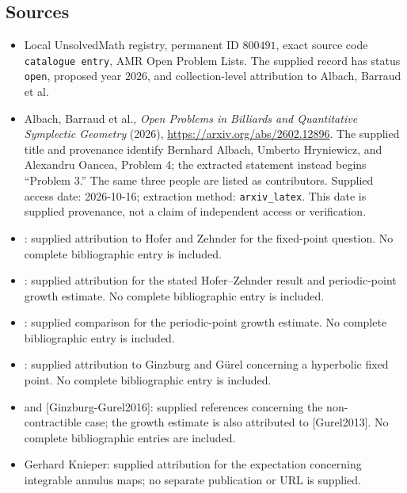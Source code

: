 \documentclass[11pt]{article}
\begin{document}
\subsection{Sources}
\begin{itemize}
\item Local UnsolvedMath registry, permanent ID \(800491\), exact source code \texttt{catalogue entry}, AMR Open Problem Lists. The supplied record has status \texttt{open}, proposed year \(2026\), and collection-level attribution to Albach, Barraud et al.
\item Albach, Barraud et al., \emph{Open Problems in Billiards and Quantitative Symplectic Geometry} (2026), \url{https://arxiv.org/abs/2602.12896}. The supplied title and provenance identify Bernhard Albach, Umberto Hryniewicz, and Alexandru Oancea, Problem 4; the extracted statement instead begins ``Problem 3.'' The same three people are listed as contributors. Supplied access date: 2026-10-16; extraction method: \texttt{arxiv\_latex}. This date is supplied provenance, not a claim of independent access or verification.
\item [HZ, p.\ 263]: supplied attribution to Hofer and Zehnder for the fixed-point question. No complete bibliographic entry is included.
\item [Shelukhin]: supplied attribution for the stated Hofer--Zehnder result and periodic-point growth estimate. No complete bibliographic entry is included.
\item [Hingston1993]: supplied comparison for the periodic-point growth estimate. No complete bibliographic entry is included.
\item [Ginzburg-Gurel2014]: supplied attribution to Ginzburg and G\"urel concerning a hyperbolic fixed point. No complete bibliographic entry is included.
\item [Gurel2013] and [Ginzburg-Gurel2016]: supplied references concerning the non-contractible case; the growth estimate is also attributed to [Gurel2013]. No complete bibliographic entries are included.
\item Gerhard Knieper: supplied attribution for the expectation concerning integrable annulus maps; no separate publication or URL is supplied.
\end{itemize}
\end{document}
